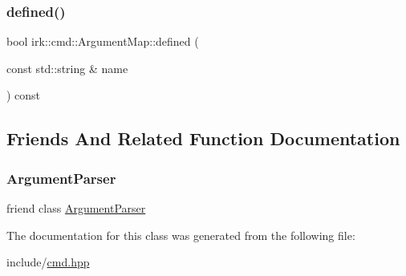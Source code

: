 \mbox{\label{classirk_1_1cmd_1_1ArgumentMap_a32d9361a13e2420d4d4ae8cd19fcf8d7}} 
\subsubsection{\texorpdfstring{defined()}{defined()}}
{\footnotesize\ttfamily bool irk\+::cmd\+::\+Argument\+Map\+::defined (\begin{DoxyParamCaption}\item[{const std\+::string \&}]{name }\end{DoxyParamCaption}) const\hspace{0.3cm}{\ttfamily [inline]}}



\subsection{Friends And Related Function Documentation}
\mbox{\label{classirk_1_1cmd_1_1ArgumentMap_a55c9e1ac006a645af402e3aee6b64e00}} 
\subsubsection{\texorpdfstring{Argument\+Parser}{ArgumentParser}}
{\footnotesize\ttfamily friend class \mbox{\hyperlink{classirk_1_1cmd_1_1ArgumentParser}{Argument\+Parser}}\hspace{0.3cm}{\ttfamily [friend]}}



The documentation for this class was generated from the following file\+:\begin{DoxyCompactItemize}
\item 
include/\mbox{\hyperlink{cmd_8hpp}{cmd.\+hpp}}\end{DoxyCompactItemize}
